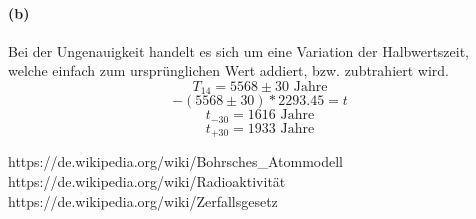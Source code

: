 \documentclass{school}
\begin{document}
\paragraph*{(b)}
Bei der Ungenauigkeit handelt es sich um eine Variation der Halbwertszeit, welche einfach zum ursprünglichen Wert addiert, bzw. zubtrahiert wird.
$$T_{14} = 5568 \pm 30 \text{ Jahre}$$
$$- (5568 \pm 30) *2293.45 = t$$
$$t_{-30} = 1616 \text{ Jahre}$$
$$t_{+30} = 1933 \text{ Jahre}$$

\newpage
\begin{thebibliography}{9}
     https://de.wikipedia.org/wiki/Bohrsches\_Atommodell
     https://de.wikipedia.org/wiki/Radioaktivität
     https://de.wikipedia.org/wiki/Zerfallsgesetz
\end{thebibliography}

\listoffigures
\end{document}
